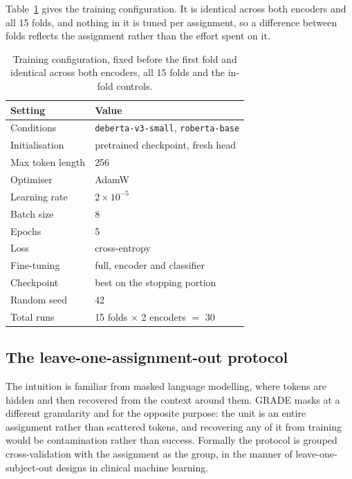 \documentclass[11pt,a4paper]{article}
\begin{document}
Table~\ref{tab:recipe} gives the training configuration. It is identical
across both encoders and all 15 folds, and nothing in it is tuned per
assignment, so a difference between folds reflects the assignment rather
than the effort spent on it.

\begin{table}[tb]
\centering
\small
\caption{Training configuration, fixed before the first fold and identical
across both encoders, all 15 folds and the in-fold controls.}
\label{tab:recipe}
\begin{tabular}{@{}ll@{}}
\toprule
\textbf{Setting} & \textbf{Value} \\
\midrule
Conditions        & \texttt{deberta-v3-small}, \texttt{roberta-base} \\
Initialisation    & pretrained checkpoint, fresh head \\
Max token length  & 256 \\
Optimiser         & AdamW \\
Learning rate     & $2\times10^{-5}$ \\
Batch size        & 8 \\
Epochs            & 5 \\
Loss              & cross-entropy \\
Fine-tuning       & full, encoder and classifier \\
Checkpoint        & best on the stopping portion \\
Random seed       & 42 \\
Total runs        & 15 folds $\times$ 2 encoders $=$ 30 \\
\bottomrule
\end{tabular}
\end{table}

\subsection{The leave-one-assignment-out protocol}
\label{sec:protocol}

The intuition is familiar from masked language modelling, where tokens are
hidden and then recovered from the context around them. GRADE masks at a
different granularity and for the opposite purpose: the unit is an entire
assignment rather than scattered tokens, and recovering any of it from
training would be contamination rather than success. Formally the protocol
is grouped cross-validation with the assignment as the group, in the manner
of leave-one-subject-out designs in clinical machine learning.
\end{document}

